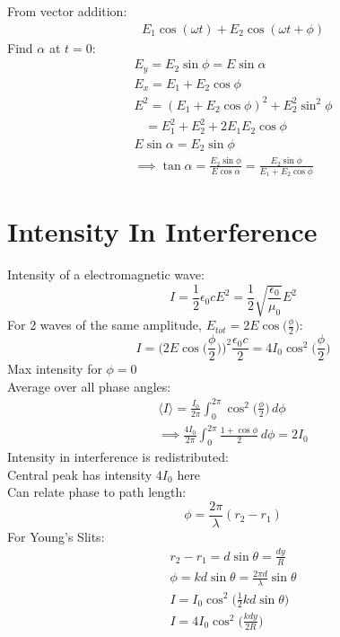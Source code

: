 \documentclass[a4paper, 11pt, fleqn, normalem]{report}
\begin{document}
From vector addition:
\begin{gather*}
    E_{1}\cos{(\omega t)} + E_{2}\cos{(\omega t + \phi)}
\end{gather*}
Find $\alpha$ at $t = 0$:
\begin{gather*}
    E_{y} = E_{2}\sin{\phi} = E\sin{\alpha} \\
    E_{x} = E_{1} + E_{2}\cos{\phi} \\
    E^{2} = (E_{1} + E_{2}\cos{\phi})^{2} + E_{2}^{2}\sin^{2}{\phi} \\
    ~~~\, = E_{1}^{2} + E_{2}^{2} + 2E_{1}E_{2}\cos{\phi} \\
    E\sin{\alpha} = E_{2}\sin{\phi} \\
    \implies \tan{\alpha} = \frac{E_{2}\sin{\phi}}{E\cos{\alpha}} = \frac{E_{2}\sin{\phi}}{E_{1} + E_{2}\cos{\phi}}
\end{gather*}

\section{Intensity In Interference}
Intensity of a electromagnetic wave:
\begin{equation*}
    I = \frac{1}{2}\epsilon_{0}cE^{2} = \frac{1}{2}\sqrt{\frac{\epsilon_{0}}{\mu_{0}}}E^{2}
\end{equation*}
For 2 waves of the same amplitude, $E_{tot} = 2E\cos{\Big(\frac{\phi}{2}\Big)}$:
\begin{equation*}
    I = \Big(2E\cos{\Big(\frac{\phi}{2}\Big)}\Big)^{2} \frac{\epsilon_{0}c}{2} = 4I_{0}\cos^{2}{\Big(\frac{\phi}{2}\Big)}
\end{equation*}
Max intensity for $\phi = 0$\\
Average over all phase angles:
\begin{gather*}
    \langle I\rangle = \frac{I_{0}}{2\pi}\int_{0}^{2\pi}\cos^{2}{\Big(\frac{\phi}{2}\Big)}\, d\phi \\
    \implies \frac{4I_{0}}{2\pi}\int_{0}^{2\pi}\frac{1 + \cos{\phi}}{2}\, d\phi = 2I_{0}
\end{gather*}
Intensity in interference is redistributed: \\
Central peak has intensity $4I_{0}$ here \\
Can relate phase to path length:
\begin{equation*}
    \phi = \frac{2\pi}{\lambda}(r_{2} - r_{1})
\end{equation*}
For Young's Slits:
\begin{gather*}
    r_{2} - r_{1} = d\sin{\theta} = \frac{dy}{R} \\
    \phi = kd\sin{\theta} = \frac{2\pi d}{\lambda}\sin{\theta} \\
    I = I_{0}\cos^{2}{\Big(\frac{1}{2}kd\sin{\theta}\Big)} \\
    I = 4I_{0}\cos^{2}{\Big(\frac{kdy}{2R}\Big)}
\end{gather*}
\end{document}
